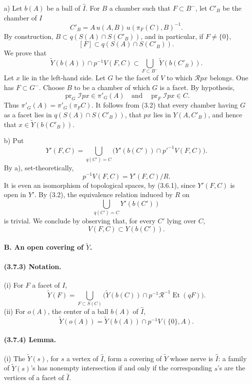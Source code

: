 \documentclass[10pt]{article}
\begin{document}
a) Let \(b(A)\) be a ball of \(\widehat I\). For \(B\) a chamber such that \(F\subset B^{-}\), let \(C'_B\) be the chamber of \(I\)
\[
C'_B=A\,u(A,B)\,u(\pi_F(C),B)^{-1}.
\]
By construction, \(B\subset q(S(A)\cap S(C'_B))\), and in particular, if \(F\ne\{0\}\),
\[
\tag{3.7.1}
[F]\subset q(S(A)\cap S(C'_B)).
\]
We prove that
\[
\tag{3.7.2}
\widetilde Y(b(A))\cap p^{-1}V(F,C)
\subset
\bigcup_{F\subset B^-}\widetilde Y(b(C'_B)).
\]
Let \(x\) lie in the left-hand side. Let \(G\) be the facet of \(V\) to which \(\mathcal Rpx\) belongs. One has \(F\subset G^{-}\). Choose \(B\) to be a chamber of which \(G\) is a facet. By hypothesis,
\[
\operatorname{pr}_G\mathcal Ipx\in\pi'_G(A)
\quad\text{and}\quad
\operatorname{pr}_F\mathcal Ipx\in C.
\]
Thus \(\pi'_G(A)=\pi'_G(\pi_FC)\). It follows from (3.2) that every chamber having \(G\) as a facet lies in \(q(S(A)\cap S(C'_B))\), that \(px\) lies in \(Y(A,C'_B)\), and hence that \(x\in\widetilde Y(b(C'_B))\).

b) Put
\[
Y'(F,C)=
\bigcup_{q(C')=C}
\bigl(Y'(b(C'))\cap p'^{-1}V(F,C)\bigr).
\]
By a), set-theoretically,
\[
p^{-1}V(F,C)=Y'(F,C)/R.
\]
It is even an isomorphism of topological spaces, by (3.6.1), since \(Y'(F,C)\) is open in \(Y'\). By (3.2), the equivalence relation induced by \(R\) on
\[
\bigcup_{q(C')=C}Y'(b(C'))
\]
is trivial. We conclude by observing that, for every \(C'\) lying over \(C\),
\[
V(F,C)\subset Y(b(C')).
\]

\paragraph{B. An open covering of \(\widetilde Y\).}

\paragraph{(3.7.3) Notation.} (i) For \(F\) a facet of \(I\),
\[
\widetilde Y(F)=
\bigcup_{F\subset S(C)}
\bigl(\widetilde Y(b(C))\cap p^{-1}\mathcal R^{-1}\operatorname{Et}(qF)\bigr).
\]
(ii) For \(o(A)\), the center of a ball \(b(A)\) of \(\widehat I\),
\[
\widetilde Y(o(A))=\widetilde Y(b(A))\cap p^{-1}V(\{0\},A).
\]

\paragraph{(3.7.4) Lemma.} (i) The \(\widetilde Y(s)\), for \(s\) a vertex of \(\widehat I\), form a covering of \(\widetilde Y\) whose nerve is \(\widehat I\): a family of \(\widetilde Y(s)\)'s has nonempty intersection if and only if the corresponding \(s\)'s are the vertices of a facet of \(\widehat I\).
\end{document}
